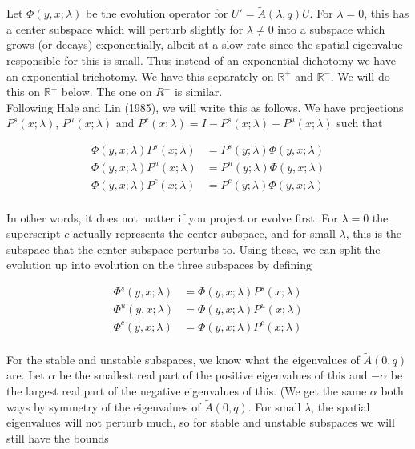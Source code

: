 \documentclass[12pt]{article}
\def\R{{\mathbb R}}
\begin{document}
Let $\Phi(y,x; \lambda)$ be the evolution operator for $U' = \tilde{A}(\lambda, q) U$. For $\lambda = 0$, this has a center subspace which will perturb slightly for $\lambda \neq 0$ into a subspace which grows (or decays) exponentially, albeit at a slow rate since the spatial eigenvalue responsible for this is small. Thus instead of an exponential dichotomy we have an exponential trichotomy. We have this separately on $\R^+$ and $\R^-$. We will do this on $\R^+$ below. The one on $R^-$ is similar.\\

Following Hale and Lin (1985), we will write this as follows. We have projections $P^s(x; \lambda)$, $P^u(x; \lambda)$ and $P^c(x; \lambda) = I - P^s(x; \lambda) - P^u(x; \lambda)$ such that

\begin{align*}
\Phi(y, x; \lambda)P^s(x; \lambda) &= P^s(y; \lambda)\Phi(y, x; \lambda) \\
\Phi(y, x; \lambda)P^u(x; \lambda) &= P^u(y; \lambda)\Phi(y, x; \lambda) \\
\Phi(y, x; \lambda)P^c(x; \lambda) &= P^c(y; \lambda)\Phi(y, x; \lambda) \\
\end{align*}

In other words, it does not matter if you project or evolve first. For $\lambda = 0$ the superscript $c$ actually represents the center subspace, and for small $\lambda$, this is the subspace that the center subspace perturbs to. Using these, we can split the evolution up into evolution on the three subspaces by defining

\begin{align*}
\Phi^s(y, x; \lambda) &= \Phi(y, x; \lambda)P^s(x; \lambda) \\
\Phi^u(y, x; \lambda) &= \Phi(y, x; \lambda)P^u(x; \lambda) \\
\Phi^c(y, x; \lambda) &= \Phi(y, x; \lambda)P^c(x; \lambda) \\
\end{align*}

For the stable and unstable subspaces, we know what the eigenvalues of $\tilde{A}(0, q)$ are. Let $\alpha$ be the smallest real part of the positive eigenvalues of this and $-\alpha$ be the largest real part of the negative eigenvalues of this. (We get the same $\alpha$ both ways by symmetry of the eigenvalues of $\tilde{A}(0, q)$. For small $\lambda$, the spatial eigenvalues will not perturb much, so for stable and unstable subspaces we will still have the bounds
\end{document}
